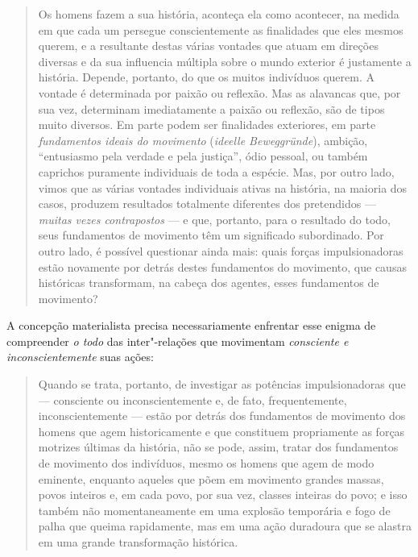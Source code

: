 \begin{quote}
Os homens fazem a sua história, aconteça ela como acontecer, na medida
em que cada um persegue conscientemente as finalidades que eles mesmos
querem, e a resultante destas várias vontades que atuam em direções
diversas e da sua influencia múltipla sobre o mundo exterior é
justamente a história. Depende, portanto, do que os muitos indivíduos
querem. A vontade é determinada por paixão ou reflexão. Mas as alavancas
que, por sua vez, determinam imediatamente a paixão ou reflexão, são de
tipos muito diversos. Em parte podem ser finalidades exteriores, em
parte \emph{fundamentos ideais do movimento} (\emph{ideelle
Beweggründe}), ambição, ``entusiasmo pela verdade e pela justiça'', ódio
pessoal, ou também caprichos puramente individuais de toda a espécie.
Mas, por outro lado, vimos que as várias vontades individuais ativas na
história, na maioria dos casos, produzem resultados totalmente
diferentes dos pretendidos --- \emph{muitas vezes contrapostos} --- e que,
portanto, para o resultado do todo, seus fundamentos de movimento têm um
significado subordinado. Por outro lado, é possível questionar ainda
mais: quais forças impulsionadoras estão novamente por detrás destes
fundamentos do movimento, que causas históricas transformam, na cabeça
dos agentes, esses fundamentos de movimento?
\end{quote}

A concepção materialista precisa necessariamente enfrentar esse enigma
de compreender \emph{o todo} das inter"-relações que movimentam
\emph{consciente e inconscientemente} suas ações:

\begin{quote}
Quando se trata, portanto, de investigar as potências impulsionadoras
que --- consciente ou inconscientemente e, de fato, frequentemente,
inconscientemente --- estão por detrás dos fundamentos de movimento dos
homens que agem historicamente e que constituem propriamente as forças
motrizes últimas da história, não se pode, assim, tratar dos fundamentos
de movimento dos indivíduos, mesmo os homens que agem de modo eminente,
enquanto aqueles que põem em movimento grandes massas, povos inteiros e,
em cada povo, por sua vez, classes inteiras do povo; e isso também não
momentaneamente em uma explosão temporária e fogo de palha que queima
rapidamente, mas em uma ação duradoura que se alastra em uma grande
transformação histórica.
\end{quote}


